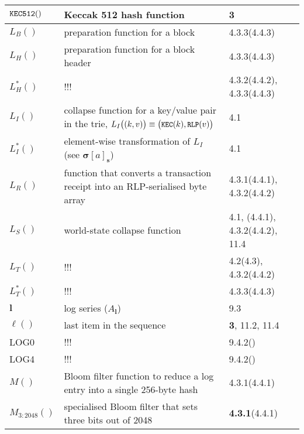 \documentclass[9pt,oneside]{amsart}
\newcommand{\reff}[1]{{\footnotesize #1}}
\begin{document}
\begin{longtabu}{X[1.2lm] X[3] X}
$\mathtt{\small KEC512}()$ &
Keccak 512 hash function &
\reff{3} \\\hline

$L_{B}()$ &
preparation function for a block &
\reff{4.3.3(4.4.3)} \\\hline

$L_{H}()$ &
preparation function for a block header &
\reff{4.3.3(4.4.3)} \\\hline

$L_{H}^*()$ &
!!! &
\reff{4.3.2(4.4.2), 4.3.3(4.4.3)} \\\hline

$L_{I}()$ &
collapse function for a key/value pair in the trie, $L_{I}\big( (k, v) \big) \equiv \big(\texttt{\small KEC}(k), \texttt{\small RLP}(v)\big)$ &
\reff{4.1} \\\hline

$L_{I}^*()$ &
element-wise transformation of $L_{I}$ (see $\boldsymbol{\sigma}[a]_{\mathbf{s}}$) &
\reff{4.1} \\\hline

$L_{R}()$ &
function that converts a transaction receipt into an RLP-serialised byte array &
\reff{4.3.1(4.4.1), 4.3.2(4.4.2)} \\\hline

$L_{S}()$ &
world-state collapse function &
\reff{4.1, (4.4.1), 4.3.2(4.4.2), 11.4} \\\hline

$L_{T}()$ &
!!! &
\reff{4.2(4.3), 4.3.2(4.4.2)} \\\hline

$L_{T}^*()$ &
!!! &
\reff{4.3.3(4.4.3)} \\\hline

$\mathbf{l}$ &
log series ($A_{\mathbf{l}}$) &
\reff{9.3} \\\hline

$\ell()$ &
last item in the sequence &
\reff{\textbf{3}, 11.2, 11.4} \\\hline

{\small LOG0} &
!!! &
\reff{9.4.2()} \\\hline

{\small LOG4} &
!!! &
\reff{9.4.2()} \\\hline

$M()$ &
Bloom filter function to reduce a log entry into a single 256-byte hash &
\reff{4.3.1(4.4.1)} \\\hline

$M_{3:2048}()$ &
specialised Bloom filter that sets three bits out of 2048 &
\reff{\textbf{4.3.1}(4.4.1)} \\\hline


\end{longtabu}
\end{document}
